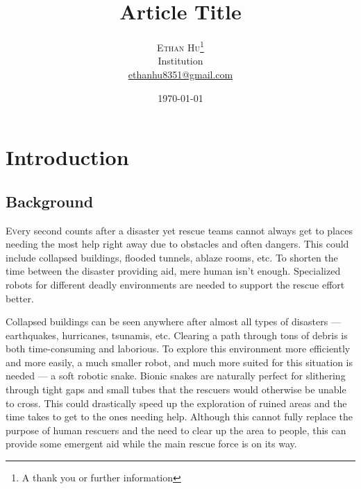\documentclass[twoside]{article}
\title{Article Title} %
\author{%
\textsc{Ethan Hu}\thanks{A thank you or further information} \\[1ex] %
\normalsize Institution \\ %
\normalsize \href{mailto:ethanhu8351@gmail.com}{ethanhu8351@gmail.com} %
}
\date{\today} %
\begin{document}
\maketitle


\section{Introduction}
\subsection{Background}
\lettrine[nindent=0em,lines=3]{E} very second counts after a disaster yet rescue teams cannot always get to places needing the most help right away due to obstacles and often dangers. This could include collapsed buildings, flooded tunnels, ablaze rooms, etc. To shorten the time between the disaster providing aid, mere human isn't enough. Specialized robots for different deadly environments are needed to support the rescue effort better. 

Collapsed buildings can be seen anywhere after almost all types of disasters — earthquakes, hurricanes, tsunamis, etc. Clearing a path through tons of debris is both time-consuming and laborious. To explore this environment more efficiently and more easily, a much smaller robot, and much more suited for this situation is needed — a soft robotic snake. Bionic snakes are naturally perfect for slithering through tight gaps and small tubes that the rescuers would otherwise be unable to cross. This could drastically speed up the exploration of ruined areas and the time takes to get to the ones needing help. Although this cannot fully replace the purpose of human rescuers and the need to clear up the area to people, this can provide some emergent aid while the main rescue force is on its way. 
\end{document}
